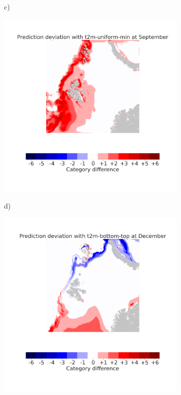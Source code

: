 \documentclass[../main/thesis.tex]{subfiles}
\begin{document}
\begin{figure}
\begin{subfigure}[t]{.455\textwidth}
    \end{subfigure}
    \begin{subfigure}[t]{.03\textwidth}
        c)
    \end{subfigure}
    \begin{subfigure}[t]{.455\textwidth}
        \includegraphics[width=\textwidth, valign=t]{bias_t2m-uniform-min}
    \end{subfigure}
    \begin{subfigure}[t]{.03\textwidth}
        d)
    \end{subfigure}
    \begin{subfigure}[t]{.455\textwidth}
        \includegraphics[width=\textwidth, valign=t]{bias_t2m-bottom-top}

\end{subfigure}
\end{figure}
\end{document}
